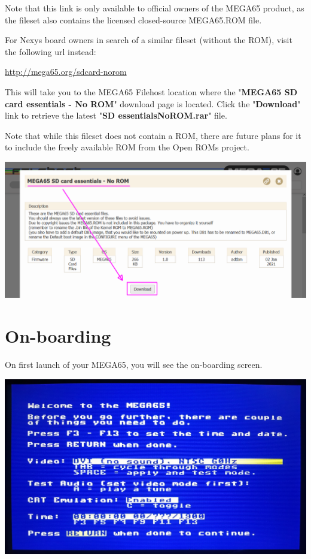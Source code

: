 Note that this link is only available to official owners of the MEGA65 product, as the fileset also contains the licensed closed-source MEGA65.ROM file.

For Nexys board owners in search of a similar fileset (without the ROM), visit the following url instead:

\url{http://mega65.org/sdcard-norom}

This will take you to the MEGA65 Filehost location where the "\textbf{MEGA65 SD card essentials - No ROM}" download page is located. Click the "\textbf{Download}" link to retrieve the latest "\textbf{SD essentialsNoROM.rar}" file.

Note that while this fileset does not contain a ROM, there are future plans for it to include the freely available ROM from the Open ROMs project.

\includegraphics[width=\linewidth]{images/latest_support_files.png}

\label{onboarding}
\section{On-boarding}

On first launch of your MEGA65, you will see the on-boarding screen.

\begin{center}
  \includegraphics[width=0.7\linewidth]{images/img011_final_boot_01.jpg}
\end{center}

